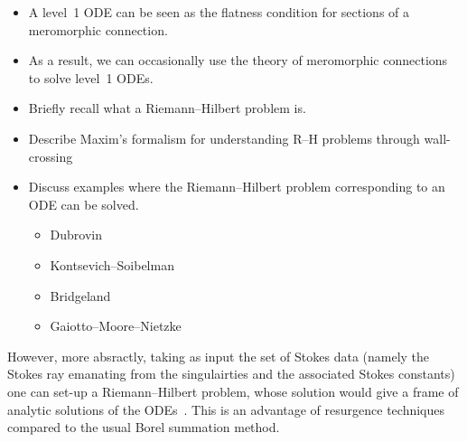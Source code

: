 \documentclass{article}
\theoremstyle{definition}
\theoremstyle{plain}
\newenvironment{brainstorm}{\color{BlueViolet}\begin{itemize}}{\end{itemize}\color{black}}
\newenvironment{old}{\color{RoyalBlue}}{\color{black}}
\begin{document}
\begin{brainstorm}
\item A level~1 ODE can be seen as the flatness condition for sections of a meromorphic connection.
\item As a result, we can occasionally use the theory of meromorphic connections to solve level~1 ODEs.
\item Briefly recall what a Riemann--Hilbert problem is.
\item Describe Maxim's formalism for understanding R--H problems through wall-crossing
\item Discuss examples where the Riemann--Hilbert problem corresponding to an ODE can be solved.
\begin{itemize}
\item Dubrovin
\item Kontsevich--Soibelman
\item Bridgeland
\item Gaiotto--Moore--Nietzke
\end{itemize}
\end{brainstorm}
\begin{old}\par
However, more absractly, taking as input the set of Stokes data (namely the Stokes ray emanating from the singulairties and the associated Stokes constants) one can set-up a Riemann--Hilbert problem, whose solution would give a frame of analytic solutions of the ODEs~\cite{kontsevich2022analyticity}. This is an advantage of resurgence techniques compared to the usual Borel summation method. 
\end{old}
%
\end{document}
